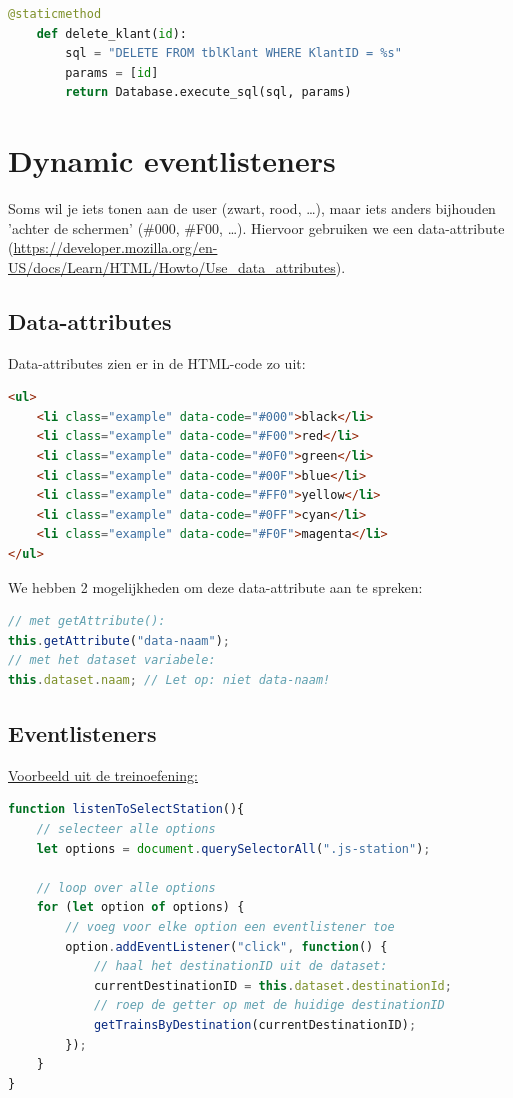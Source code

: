 \documentclass{article}
\begin{document}
\begin{lstlisting}[language=Python]
    @staticmethod
    def delete_klant(id):
        sql = "DELETE FROM tblKlant WHERE KlantID = %s"
        params = [id]
        return Database.execute_sql(sql, params)
\end{lstlisting}


\section{Dynamic eventlisteners}
Soms wil je iets tonen aan de user (zwart, rood, \dots), maar iets anders bijhouden 'achter de schermen' (\#000, \#F00, \dots).
Hiervoor gebruiken we een data-attribute (\url{https://developer.mozilla.org/en-US/docs/Learn/HTML/Howto/Use_data_attributes}).

\subsection{Data-attributes}

Data-attributes zien er in de HTML-code zo uit:

\begin{lstlisting}[language=HTML]
<ul>
    <li class="example" data-code="#000">black</li>
    <li class="example" data-code="#F00">red</li>
    <li class="example" data-code="#0F0">green</li>
    <li class="example" data-code="#00F">blue</li>
    <li class="example" data-code="#FF0">yellow</li>
    <li class="example" data-code="#0FF">cyan</li>
    <li class="example" data-code="#F0F">magenta</li>
</ul>
\end{lstlisting}

We hebben 2 mogelijkheden om deze data-attribute aan te spreken:
\begin{lstlisting}[language=JavaScript]
// met getAttribute():
this.getAttribute("data-naam");
// met het dataset variabele:
this.dataset.naam; // Let op: niet data-naam!
\end{lstlisting}

\subsection{Eventlisteners}
\underline{Voorbeeld uit de treinoefening:}

\begin{lstlisting}[language=JavaScript] 
function listenToSelectStation(){
    // selecteer alle options
    let options = document.querySelectorAll(".js-station");

    // loop over alle options
    for (let option of options) {
        // voeg voor elke option een eventlistener toe
        option.addEventListener("click", function() {
            // haal het destinationID uit de dataset:
            currentDestinationID = this.dataset.destinationId;
            // roep de getter op met de huidige destinationID
            getTrainsByDestination(currentDestinationID);
        });
    }
}
\end{lstlisting}
\end{document}
